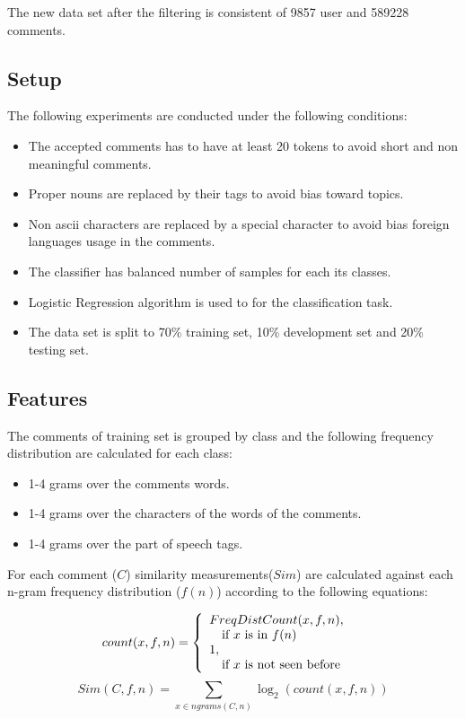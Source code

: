 \documentclass[11pt]{article}
\begin{document}
The new data set after the filtering is consistent of 9857 user and 589228 comments.

\subsection{Setup}
The following experiments are conducted under the following conditions:
\begin{itemize}
\item The accepted comments has to have at least 20 tokens to avoid short and non meaningful comments.
\item Proper nouns are replaced by their tags to avoid bias toward topics.
\item Non ascii characters are replaced by a special character to avoid bias foreign languages usage in the comments.
\item The classifier has balanced number of samples for each its classes.
\item Logistic Regression algorithm is used to for the classification task.
\item The data set is split to 70\% training set, 10\% development set and 20\% testing set.
\end{itemize}

\subsection{Features}
The comments of training set is grouped by class and the following frequency distribution are calculated for each class:
\begin{itemize}
\item 1-4 grams over the comments words.
\item 1-4 grams over the characters of the words of the comments.
\item 1-4 grams over the part of speech tags.
\end{itemize}

For each comment ($C$) similarity measurements($Sim$) are calculated against each n-gram frequency distribution ($f(n)$) according to the following equations:

\[
  count(x, f, n) = \left\{ 
  \begin{array}{l l}
    FreqDistCount(x, f, n), & \\\quad \text{if $x$ is in $f(n)$}\\
    1,&\\\quad \text{if $x$ is not seen before}\\
  \end{array} \right.
\]
\[
  Sim(C,f,n) = \sum_{x \in ngrams(C,n)} \log_2 (count(x,f,n))
\]
\end{document}
